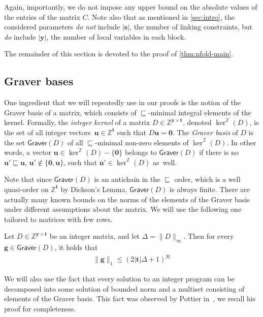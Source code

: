 \documentclass{theoretics}
\renewcommand{\leq}{\leqslant}
\newcommand{\cfleq}{\sqsubseteq}
\newcommand{\Z}{\mathbb{Z}}
\newcommand{\tup}[1]{{\mathbf{#1}}}
\newcommand{\yy}{\tup y}
\newcommand{\sv}{\tup s}
\newcommand{\tv}{\tup t}
\renewcommand{\gg}{\tup g}
\newcommand{\uu}{\tup u}
\newcommand{\matrices}[3]{#1^{#2\times #3}}
\newcommand{\Graver}{\mathsf{Graver}}
\renewcommand{\setminus}{-}
\begin{document}
Again, importantly, we do not impose any upper bound on the absolute values of the entries of the matrix $C$. Note also that as mentioned in \cref{sec:intro}, the considered parameters {\em{do not}} include $|\sv|$, the number of linking constraints, but {\em{do}} include $|\yy|$, the number of local variables in each block.

The remainder of this section is devoted to the proof of \cref{thm:nfold-main}.

\subsection{Graver bases}\label{sec:Gravers}

One ingredient that we will repeatedly use in our proofs is the notion of the Graver basis of a matrix, which consists of $\cfleq$-minimal integral elements of the kernel. Formally, the {\em{integer kernel}} of a matrix $D \in \matrices{\Z}{\yy}{\tv}$, denoted $\ker^\Z(D)$, is the set of all integer vectors~$\uu \in \Z^{\tv}$ such that $D\uu = \mathbf{0}$. The {\em{Graver basis}} of $D$ is the set $\Graver(D)$ of all $\cfleq$-minimal non-zero elements of $\ker^\Z(D)$. In other words, a vector $\uu\in \ker^\Z(D)\setminus \{\mathbf{0}\}$ belongs to $\Graver(D)$ if there is no $\uu'\cfleq \uu$, $\uu'\notin \{\mathbf{0},\uu\}$, such that $\uu'\in \ker^\Z(D)$ as~well.

Note that since $\Graver(D)$ is an antichain in the $\cfleq$ order, which is a well quasi-order on $\Z^\tv$ by Dickson's Lemma, $\Graver(D)$ is always finite. There are actually many known bounds on the norms of the elements of the Graver basis under different assumptions about the matrix. We will use the following one tailored to matrices with few rows.

\begin{lemma}\label{lem:GraverBound}
Let $D \in \matrices{\Z}{\yy}{\tv}$ be an integer matrix, and let $\Delta=\|D\|_\infty$. Then for every $\gg\in \Graver(D)$, it holds that
\begin{align*}
    \|\gg\|_1 \leq (2|\tv|\Delta+1)^{|\tv|}
\end{align*}
\end{lemma}

We will also use the fact that every solution to an integer program can be decomposed into some solution of bounded norm and a multiset consisting of elements of the Graver basis. This fact was observed by Pottier in~\cite[Corollary~1]{Pottier91}, we recall his proof for completeness.
\end{document}
